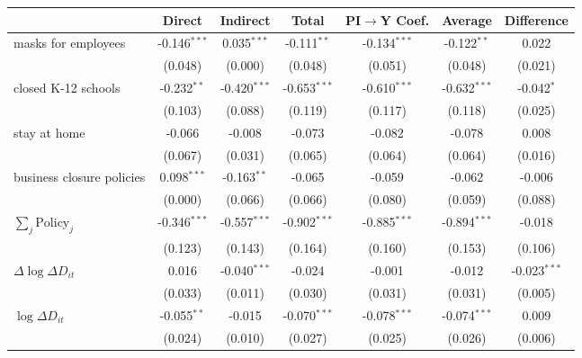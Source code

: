 
\begin{tabular}{lccccc|>{}c}
\toprule
  & Direct & Indirect & Total & PI$\to$Y Coef. & Average & Difference\\
\midrule
masks for employees & -0.146$^{***}$ & 0.035$^{***}$ & -0.111$^{**}$ & -0.134$^{***}$ & -0.122$^{**}$ & 0.022\\
 & (0.048) & (0.000) & (0.048) & (0.051) & (0.048) & (0.021)\\
closed K-12 schools & -0.232$^{**}$ & -0.420$^{***}$ & -0.653$^{***}$ & -0.610$^{***}$ & -0.632$^{***}$ & -0.042$^{*}$\\
 & (0.103) & (0.088) & (0.119) & (0.117) & (0.118) & (0.025)\\
stay at home & -0.066 & -0.008 & -0.073 & -0.082 & -0.078 & 0.008\\
 & (0.067) & (0.031) & (0.065) & (0.064) & (0.064) & (0.016)\\
business closure policies & 0.098$^{***}$ & -0.163$^{**}$ & -0.065 & -0.059 & -0.062 & -0.006\\
 & (0.000) & (0.066) & (0.066) & (0.080) & (0.059) & (0.088)\\
$\sum_j \mathrm{Policy}_j$ & -0.346$^{***}$ & -0.557$^{***}$ & -0.902$^{***}$ & -0.885$^{***}$ & -0.894$^{***}$ & -0.018\\
 & (0.123) & (0.143) & (0.164) & (0.160) & (0.153) & (0.106)\\
$\Delta \log \Delta D_{it}$ & 0.016 & -0.040$^{***}$ & -0.024 & -0.001 & -0.012 & -0.023$^{***}$\\
 & (0.033) & (0.011) & (0.030) & (0.031) & (0.031) & (0.005)\\
$\log \Delta D_{it}$ & -0.055$^{**}$ & -0.015 & -0.070$^{***}$ & -0.078$^{***}$ & -0.074$^{***}$ & 0.009\\
 & (0.024) & (0.010) & (0.027) & (0.025) & (0.026) & (0.006)\\
\bottomrule
\end{tabular}